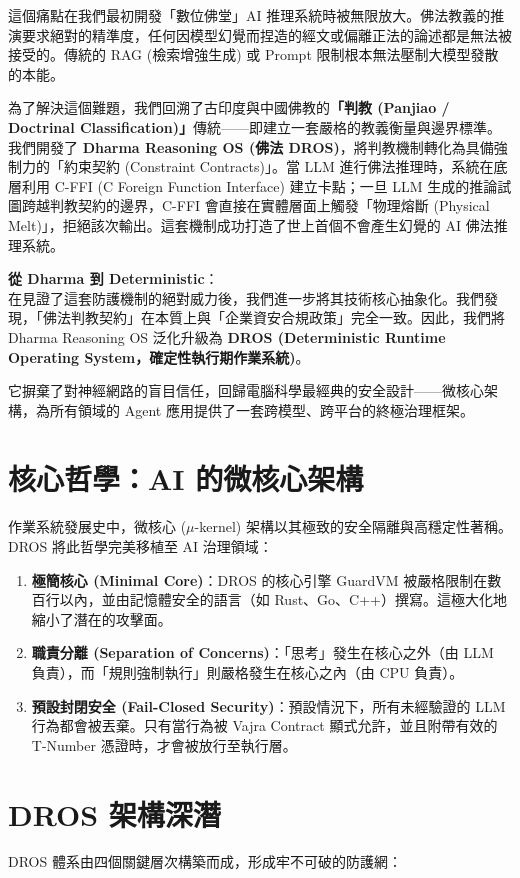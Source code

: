 \documentclass[conference]{IEEEtran}
\begin{document}
這個痛點在我們最初開發「數位佛堂」AI 推理系統時被無限放大。佛法教義的推演要求絕對的精準度，任何因模型幻覺而捏造的經文或偏離正法的論述都是無法被接受的。傳統的 RAG (檢索增強生成) 或 Prompt 限制根本無法壓制大模型發散的本能。

為了解決這個難題，我們回溯了古印度與中國佛教的\textbf{「判教 (Panjiao / Doctrinal Classification)」}傳統——即建立一套嚴格的教義衡量與邊界標準。我們開發了 \textbf{Dharma Reasoning OS (佛法 DROS)}，將判教機制轉化為具備強制力的「約束契約 (Constraint Contracts)」。當 LLM 進行佛法推理時，系統在底層利用 C-FFI (C Foreign Function Interface) 建立卡點；一旦 LLM 生成的推論試圖跨越判教契約的邊界，C-FFI 會直接在實體層面上觸發「物理熔斷 (Physical Melt)」，拒絕該次輸出。這套機制成功打造了世上首個不會產生幻覺的 AI 佛法推理系統。

\textbf{從 Dharma 到 Deterministic}：\\
在見證了這套防護機制的絕對威力後，我們進一步將其技術核心抽象化。我們發現，「佛法判教契約」在本質上與「企業資安合規政策」完全一致。因此，我們將 Dharma Reasoning OS 泛化升級為 \textbf{DROS (Deterministic Runtime Operating System，確定性執行期作業系統)}。

它摒棄了對神經網路的盲目信任，回歸電腦科學最經典的安全設計——微核心架構，為所有領域的 Agent 應用提供了一套跨模型、跨平台的終極治理框架。

\section{核心哲學：AI 的微核心架構}
作業系統發展史中，微核心 ($\mu$-kernel) 架構以其極致的安全隔離與高穩定性著稱。DROS 將此哲學完美移植至 AI 治理領域：

\begin{enumerate}
    \item \textbf{極簡核心 (Minimal Core)}：DROS 的核心引擎 GuardVM 被嚴格限制在數百行以內，並由記憶體安全的語言（如 Rust、Go、C++）撰寫。這極大化地縮小了潛在的攻擊面。
    \item \textbf{職責分離 (Separation of Concerns)}：「思考」發生在核心之外（由 LLM 負責），而「規則強制執行」則嚴格發生在核心之內（由 CPU 負責）。
    \item \textbf{預設封閉安全 (Fail-Closed Security)}：預設情況下，所有未經驗證的 LLM 行為都會被丟棄。只有當行為被 Vajra Contract 顯式允許，並且附帶有效的 T-Number 憑證時，才會被放行至執行層。
\end{enumerate}

\section{DROS 架構深潛}
DROS 體系由四個關鍵層次構築而成，形成牢不可破的防護網：
\end{document}
